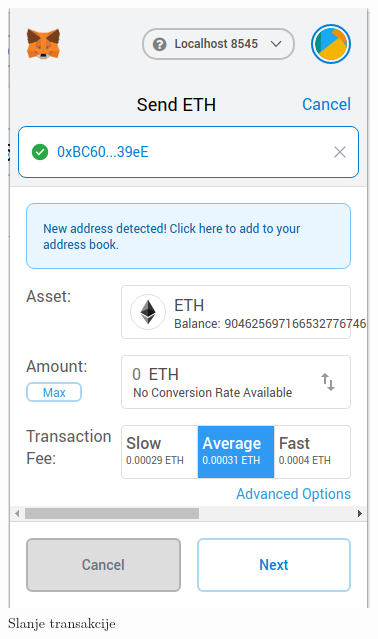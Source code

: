 \documentclass[times, utf8, zavrsni, numeric]{fer}
\begin{document}
\begin{figure}[ht]
  \centering
  \begin{minipage}[b]{0.4\textwidth}
    \includegraphics[width=\textwidth]{mmsendtocubie.png}
    \caption{Slanje transakcije}
  \end{minipage}
  \hfill
  \begin{minipage}[b]{0.4\textwidth}

\end{minipage}
\end{figure}
\end{document}
